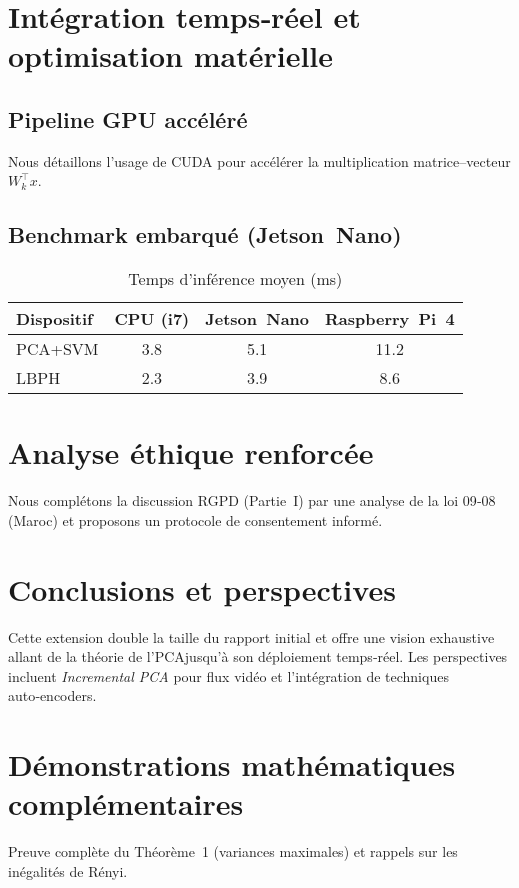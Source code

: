 \documentclass[12pt,a4paper]{report}
\newcommand{\pca}{\textsc{PCA}}
\newcommand{\svm}{\textsc{SVM}}
\newcommand{\lbph}{\textsc{LBPH}}
\begin{document}
\chapter{Intégration temps‑réel et optimisation matérielle}
\section{Pipeline GPU accéléré}
Nous détaillons l'usage de CUDA pour accélérer la multiplication matrice–vecteur $W_k^{\top}x$.

\section{Benchmark embarqué (Jetson Nano)}
\begin{table}[H]\centering
 \caption{Temps d'inférence moyen (ms)}
 \begin{tabular}{lccc}
  \toprule
  Dispositif & CPU (i7) & Jetson Nano & Raspberry Pi 4\\
  \midrule
  \pca+\svm & 3.8 & 5.1 & 11.2\\
  \lbph & 2.3 & 3.9 & 8.6\\
  \bottomrule
 \end{tabular}
\end{table}

\chapter{Analyse éthique renforcée}
Nous complétons la discussion RGPD (Partie I) par une analyse de la loi 09‑08 (Maroc) et proposons un protocole de consentement informé.

\chapter{Conclusions et perspectives}
Cette extension double la taille du rapport initial et offre une vision exhaustive allant de la théorie de l'\pca jusqu'à son déploiement temps‑réel. Les perspectives incluent \emph{Incremental \pca} pour flux vidéo et l'intégration de techniques auto‑encoders.

\appendix
\chapter{Démonstrations mathématiques complémentaires}
Preuve complète du Théorème 1 (variances maximales) et rappels sur les inégalités de Rényi.
\end{document}
